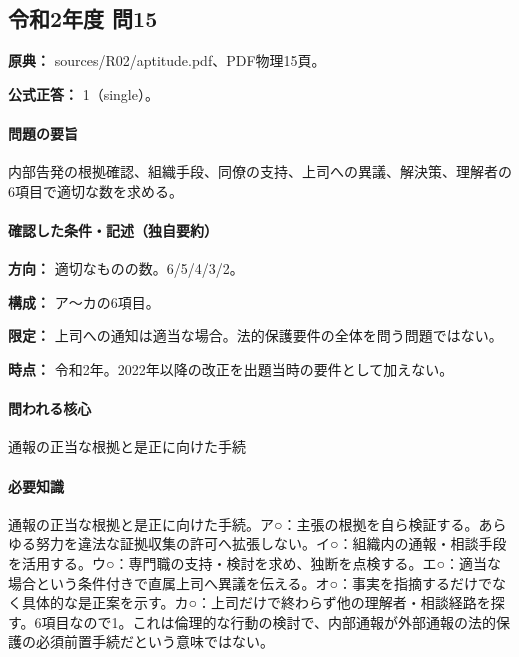 \subsection{令和2年度 問15}
\label{q:r02-reg-apt-15}

\noindent\textbf{原典：} sources/R02/aptitude.pdf、PDF物理15頁。

\textbf{公式正答：} 1（single）。

\paragraph{問題の要旨} 内部告発の根拠確認、組織手段、同僚の支持、上司への異議、解決策、理解者の6項目で適切な数を求める。

\paragraph{確認した条件・記述（独自要約）}\mbox{}\par

\noindent\textbf{方向：} 適切なものの数。6/5/4/3/2。\par

\noindent\textbf{構成：} ア〜カの6項目。\par

\noindent\textbf{限定：} 上司への通知は適当な場合。法的保護要件の全体を問う問題ではない。\par

\noindent\textbf{時点：} 令和2年。2022年以降の改正を出題当時の要件として加えない。\par

\paragraph{問われる核心} 通報の正当な根拠と是正に向けた手続

\paragraph{必要知識} 通報の正当な根拠と是正に向けた手続。ア○：主張の根拠を自ら検証する。あらゆる努力を違法な証拠収集の許可へ拡張しない。イ○：組織内の通報・相談手段を活用する。ウ○：専門職の支持・検討を求め、独断を点検する。エ○：適当な場合という条件付きで直属上司へ異議を伝える。オ○：事実を指摘するだけでなく具体的な是正案を示す。カ○：上司だけで終わらず他の理解者・相談経路を探す。6項目なので1。これは倫理的な行動の検討で、内部通報が外部通報の法的保護の必須前置手続だという意味ではない。

